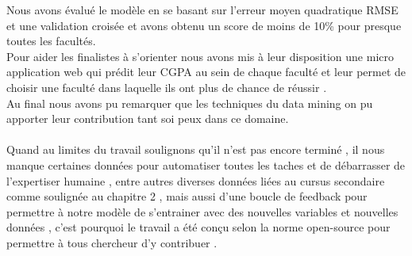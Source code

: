 Nous avons évalué le modèle en se basant sur l'erreur moyen quadratique \ac{RMSE} et une validation croisée et avons obtenu un score de moins de 10\% pour presque toutes les facultés.\\
Pour aider les finalistes à s'orienter nous avons mis à leur disposition une micro application web  qui prédit leur \ac{CGPA} au sein de chaque faculté et leur permet de choisir une faculté dans laquelle ils ont plus de chance de réussir .\\
Au final nous avons pu remarquer que les techniques du data mining on pu apporter leur contribution tant soi peux dans ce domaine. 
\paragraph{}
Quand au limites du travail soulignons qu'il n'est pas encore terminé , il nous manque certaines données pour automatiser toutes les taches et de débarrasser de l'expertiser humaine , entre autres diverses données liées au cursus secondaire comme soulignée au chapitre 2 ,  mais aussi d'une boucle de feedback pour permettre à notre modèle de s'entrainer avec des nouvelles variables et nouvelles données , c'est pourquoi le travail a été conçu selon la norme open-source pour permettre à tous chercheur d'y contribuer .